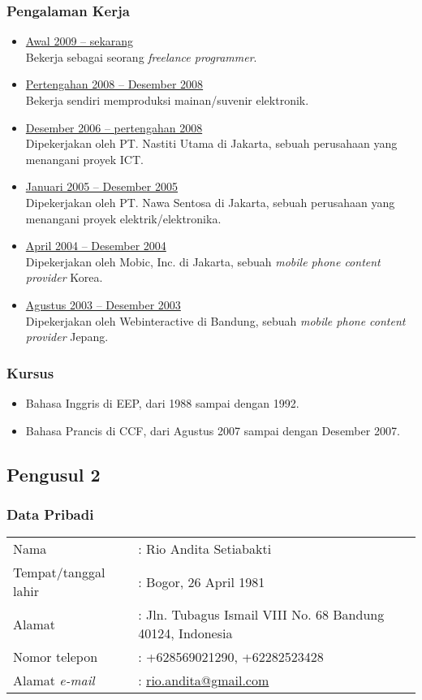 \subsubsection*{Pengalaman Kerja}
\begin{itemize}
\item \underline{Awal 2009 -- sekarang}\\
Bekerja sebagai seorang \textit{freelance programmer}.
\item \underline{Pertengahan 2008 -- Desember 2008}\\
Bekerja sendiri memproduksi mainan/suvenir elektronik.
\item \underline{Desember 2006 -- pertengahan 2008}\\
Dipekerjakan oleh PT. Nastiti Utama di Jakarta, sebuah perusahaan yang menangani proyek ICT.
\item \underline{Januari 2005 -- Desember 2005}\\
Dipekerjakan oleh PT. Nawa Sentosa di Jakarta, sebuah perusahaan yang menangani proyek elektrik/elektronika.
\item \underline{April 2004 -- Desember 2004}\\
Dipekerjakan oleh Mobic, Inc. di Jakarta, sebuah \textit{mobile phone content provider} Korea.
\item \underline{Agustus 2003 -- Desember 2003}\\
Dipekerjakan oleh Webinteractive di Bandung, sebuah \textit{mobile phone content provider} Jepang.
\end{itemize}

\subsubsection*{Kursus}
\begin{itemize}
\item Bahasa Inggris di EEP, dari 1988 sampai dengan 1992.
\item Bahasa Prancis di CCF, dari Agustus 2007 sampai dengan Desember 2007.
\end{itemize}

\subsection*{Pengusul 2}

\subsubsection*{Data Pribadi}
\begin{tabular}{ll}
Nama & : Rio Andita Setiabakti\\
Tempat\slash tanggal lahir & : Bogor, 26 April 1981\\
Alamat & : Jln. Tubagus Ismail VIII No. 68 Bandung 40124, Indonesia\\
Nomor telepon & : +628569021290, +62282523428\\
Alamat \textit{e-mail} & : \href{mailto:rio.andita@gmail.com}{rio.andita@gmail.com}
\end{tabular}

